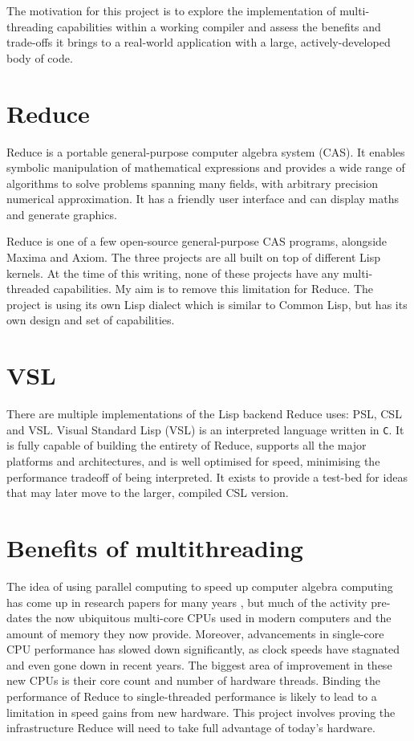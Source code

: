 The motivation for this project is to explore the implementation of multi-threading
capabilities within a working compiler and assess the benefits and trade-offs it brings
to a real-world application with a large, actively-developed body of code.

\section{Reduce}

Reduce \cite{reduce} is a portable general-purpose computer algebra system (CAS). It enables symbolic
manipulation of mathematical expressions and provides a wide range of algorithms
to solve problems spanning many fields, with arbitrary precision numerical approximation.
It has a friendly user interface and can display maths and generate graphics.

Reduce is one of a few open-source general-purpose CAS programs, alongside Maxima and Axiom.
The three projects are all built on top of different Lisp kernels. At the time of this writing,
none of these projects have any multi-threaded capabilities. My aim is to remove this limitation
for Reduce. The project is using its own Lisp dialect which is similar to Common Lisp, but has its
own design and set of capabilities.

\section{VSL}

There are multiple implementations of the Lisp backend Reduce uses: PSL, CSL and VSL.
Visual Standard Lisp (VSL) is an interpreted language written
in \texttt{C}. It is fully capable of building the entirety of Reduce, supports all the major
platforms and architectures, and is well optimised for speed, minimising the performance tradeoff
of being interpreted. It exists to provide a test-bed for ideas that may later move to the larger,
compiled CSL version.

\section{Benefits of multithreading}
The idea of using parallel computing to speed up computer algebra computing has come
up in research papers for many years \cite{GabrielQML,multilisp,multilisp-implementation},
but much of the activity
pre-dates the now ubiquitous multi-core CPUs used in modern computers and the amount of memory
they now provide. Moreover, advancements in single-core CPU performance has slowed down
significantly, as clock speeds have stagnated and even gone down in recent years. The biggest
area of improvement in these new CPUs is their core count and number of hardware threads.
Binding the performance of Reduce to single-threaded performance is likely to lead to
a limitation in speed gains from new hardware. This project involves proving the infrastructure
Reduce will need to take full advantage of today's hardware.


